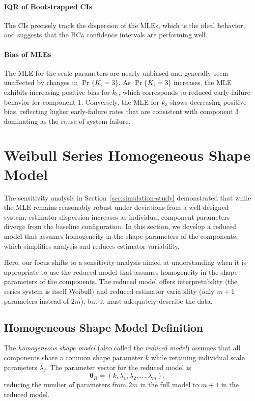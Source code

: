 \documentclass[11pt]{article}
\renewcommand{\v}[1]{\boldsymbol{#1}}
\begin{document}
\paragraph{IQR of Bootstrapped CIs}
The CIs precisely track the dispersion of the MLEs, which is the ideal behavior, and suggests that the BCa confidence intervals are performing well.

\paragraph{Bias of MLEs}
The MLE for the scale parameters are nearly unbiased and generally seem unaffected by changes in $\Pr\{K_i = 3\}$. As $\Pr\{K_i = 3\}$ increases, the MLE exhibits increasing positive bias for $k_1$, which corresponds to reduced early-failure behavior for component 1. Conversely, the MLE for $k_3$ shows decreasing positive bias, reflecting higher early-failure rates that are consistent with component 3 dominating as the cause of system failure.

\section{Weibull Series Homogeneous Shape Model}

The sensitivity analysis in Section~\ref{sec:simulation-study} demonstrated that while the MLE remains reasonably robust under deviations from a well-designed system, estimator dispersion increases as individual component parameters diverge from the baseline configuration. In this section, we develop a reduced model that assumes homogeneity in the shape parameters of the components, which simplifies analysis and reduces estimator variability.

Here, our focus shifts to a sensitivity analysis aimed at understanding when it is appropriate to use the reduced model that assumes homogeneity in the shape parameters of the components. The reduced model offers interpretability (the series system is itself Weibull) and reduced estimator variability (only $m+1$ parameters instead of $2m$), but it must adequately describe the data.

\subsection{Homogeneous Shape Model Definition}

The \emph{homogeneous shape model} (also called the \emph{reduced model}) assumes that all components share a common shape parameter $k$ while retaining individual scale parameters $\lambda_j$. The parameter vector for the reduced model is
\begin{equation}
\v\theta_R = (k, \lambda_1, \lambda_2, \ldots, \lambda_m),
\end{equation}
reducing the number of parameters from $2m$ in the full model to $m+1$ in the reduced model.
\end{document}
